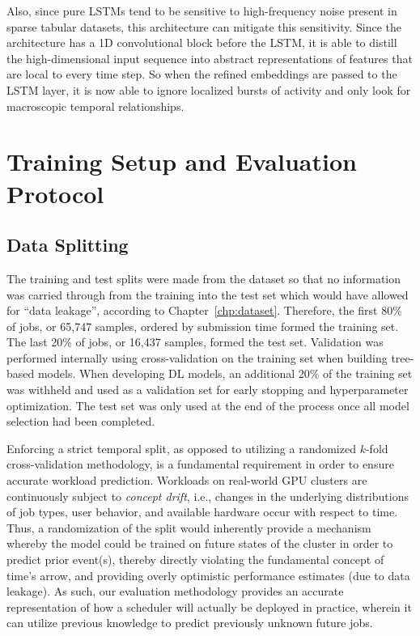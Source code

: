 \clearpage
Also, since pure LSTMs tend to be sensitive to high-frequency noise present in sparse tabular datasets, this architecture can mitigate this sensitivity. Since the architecture has a 1D convolutional block before the LSTM, it is able to distill the high-dimensional input sequence into abstract representations of features that are local to every time step. So when the refined embeddings are passed to the LSTM layer, it is now able to ignore localized bursts of activity and only look for macroscopic temporal relationships.

\section{Training Setup and Evaluation Protocol}
\label{sec:training}

\subsection{Data Splitting}

The training and test splits were made from the dataset so that no information was carried through from the training into the test set which would have allowed for ``data leakage'', according to Chapter~\ref{chp:dataset}. Therefore, the first 80\% of jobs, or 65,747 samples, ordered by submission time formed the training set. The last 20\% of jobs, or 16,437 samples, formed the test set. Validation was performed internally using cross-validation on the training set when building tree-based models. When developing DL models, an additional 20\% of the training set was withheld and used as a validation set for early stopping and hyperparameter optimization. The test set was only used at the end of the process once all model selection had been completed.

Enforcing a strict temporal split, as opposed to utilizing a randomized $k$-fold cross-validation methodology, is a fundamental requirement in order to ensure accurate workload prediction. Workloads on real-world GPU clusters are continuously subject to \textit{concept drift}, i.e., changes in the underlying distributions of job types, user behavior, and available hardware occur with respect to time. Thus, a randomization of the split would inherently provide a mechanism whereby the model could be trained on future states of the cluster in order to predict prior event(s), thereby directly violating the fundamental concept of time's arrow, and providing overly optimistic performance estimates (due to data leakage). As such, our evaluation methodology provides an accurate representation of how a scheduler will actually be deployed in practice, wherein it can utilize previous knowledge to predict previously unknown future jobs.

